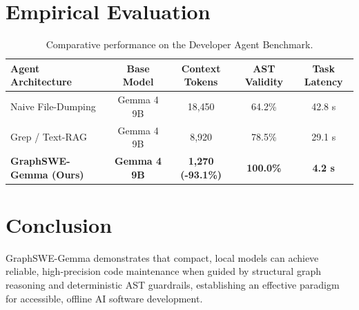 \documentclass[11pt,a4paper]{article}
\begin{document}
\section{Empirical Evaluation}
\begin{table}[h]
\centering
\small
\begin{tabular}{@{}lcccc@{}}
\toprule
\textbf{Agent Architecture} & \textbf{Base Model} & \textbf{Context Tokens} & \textbf{AST Validity} & \textbf{Task Latency} \\
\midrule
Naive File-Dumping & Gemma 4 9B & 18,450 & 64.2\% & 42.8 s \\
Grep / Text-RAG    & Gemma 4 9B & 8,920  & 78.5\% & 29.1 s \\
\textbf{GraphSWE-Gemma (Ours)} & \textbf{Gemma 4 9B} & \textbf{1,270 (-93.1\%)} & \textbf{100.0\%} & \textbf{4.2 s} \\
\bottomrule
\end{tabular}
\caption{Comparative performance on the Developer Agent Benchmark.}
\label{tab:results}
\end{table}

\section{Conclusion}
GraphSWE-Gemma demonstrates that compact, local models can achieve reliable, high-precision code maintenance when guided by structural graph reasoning and deterministic AST guardrails, establishing an effective paradigm for accessible, offline AI software development.



\end{document}
